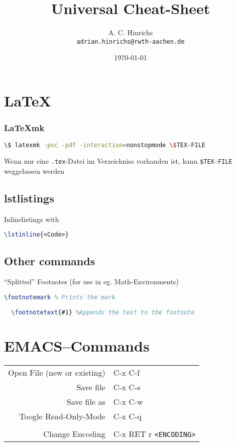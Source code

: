 \documentclass[10pt,landscape,a4paper]{CheatSheet}
\title{Universal Cheat-Sheet}
\author{A. C. Hinrichs\\\texttt{adrian.hinrichs@rwth-aachen.de}}
\date{\today}
\begin{document}
\raggedright
\footnotesize
\begin{multicols}{4}
\setlength{\premulticols}{1pt}
\setlength{\postmulticols}{1pt}
\setlength{\multicolsep}{1pt}
\setlength{\columnsep}{2pt}
\maketitle
\section{\LaTeX}
\subsubsection{\LaTeX{}mk}
\begin{lstlisting}[language=bash]
\$ latexmk -pvc -pdf -interaction=nonstopmode \$TEX-FILE
\end{lstlisting}

Wenn nur eine \texttt{.tex}-Datei im Verzeichniss vorhanden ist, kann \texttt{\$TEX-FILE}%
weggelassen werden\\
\subsection{lstlistings}
Inlinelistings with
\begin{lstlisting}[language=tex]
\lstinline{<Code>}
\end{lstlisting}
\subsection{Other commands}
\enquote{Splitted} Footnotes (for use in eg. Math-Environments)
\begin{lstlisting}[language=tex]
  \footnotemark % Prints the mark
  
  \footnotetext{#1} %Appends the text to the footnote
\end{lstlisting}

\section{EMACS--Commands}
\begin{xtabular}{rl}
  Open File (new or existing) & C-x C-f\\
  Save file & C-x C-s\\
  Save file as & C-x C-w\\
  Toogle Read-Only-Mode &C-x C-q\\
  \\
  Change Encoding & C-x RET r \texttt{<ENCODING>}\\
\end{xtabular}

\end{multicols}
\end{document}
